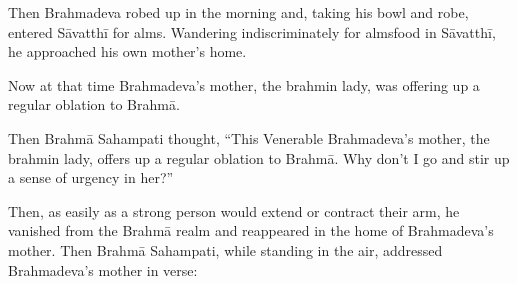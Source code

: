 \documentclass[12pt,openany]{book}%
\begin{document}
Then Brahmadeva robed up in the morning and, taking his bowl and robe, entered \textsanskrit{Sāvatthī} for alms. Wandering indiscriminately for almsfood in \textsanskrit{Sāvatthī}, he approached his own mother’s home. 

Now at that time Brahmadeva’s mother, the brahmin lady, was offering up a regular oblation to \textsanskrit{Brahmā}. 

Then \textsanskrit{Brahmā} Sahampati thought, “This Venerable Brahmadeva’s mother, the brahmin lady, offers up a regular oblation to \textsanskrit{Brahmā}. Why don’t I go and stir up a sense of urgency in her?” 

Then, as easily as a strong person would extend or contract their arm, he vanished from the \textsanskrit{Brahmā} realm and reappeared in the home of Brahmadeva’s mother. Then \textsanskrit{Brahmā} Sahampati, while standing in the air, addressed Brahmadeva’s mother in verse: 
\end{document}
